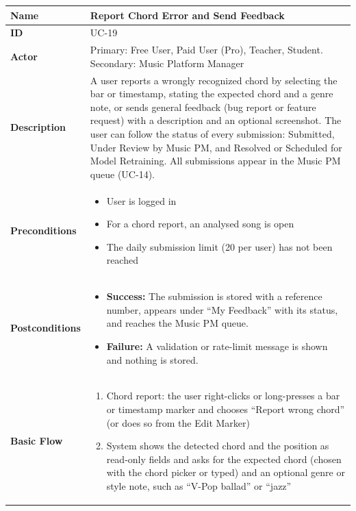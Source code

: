 \documentclass[a4paper]{article}
\newlength{\ucLeft}
\begin{document}
\begin{longtable}{|>{\bfseries}p{\ucLeft}|p{\dimexpr\linewidth-\ucLeft-2\tabcolsep-2\arrayrulewidth}|}
\hline
Name & Report Chord Error and Send Feedback \\ \hline
ID & UC-19 \\ \hline
Actor & Primary: Free User, Paid User (Pro), Teacher, Student. Secondary: Music Platform Manager \\ \hline
Description & A user reports a wrongly recognized chord by selecting the bar or timestamp, stating the expected chord and a genre note, or sends general feedback (bug report or feature request) with a description and an optional screenshot. The user can follow the status of every submission: Submitted, Under Review by Music PM, and Resolved or Scheduled for Model Retraining. All submissions appear in the Music PM queue (UC-14). \\ \hline
Preconditions &
\begin{itemize}[leftmargin=1em, nosep, topsep=2pt, partopsep=0pt, parsep=0pt, after=\strut]
    \item User is logged in
    \item For a chord report, an analysed song is open
    \item The daily submission limit (20 per user) has not been reached
\end{itemize}
\\ \hline
Postconditions &
\begin{itemize}[leftmargin=1em, nosep, topsep=2pt, partopsep=0pt, parsep=0pt, after=\strut]
    \item \textbf{Success:} The submission is stored with a reference number, appears under ``My Feedback'' with its status, and reaches the Music PM queue.
    \item \textbf{Failure:} A validation or rate-limit message is shown and nothing is stored.
\end{itemize}
\\ \hline
Basic Flow &
\begin{enumerate}[leftmargin=1.5em, nosep, topsep=2pt, partopsep=0pt, parsep=0pt, after=\strut]
    \item Chord report: the user right-clicks or long-presses a bar or timestamp marker and chooses ``Report wrong chord'' (or does so from the Edit Marker)
    \item System shows the detected chord and the position as read-only fields and asks for the expected chord (chosen with the chord picker or typed) and an optional genre or style note, such as ``V-Pop ballad'' or ``jazz''

\end{enumerate}
\end{longtable}
\end{document}
